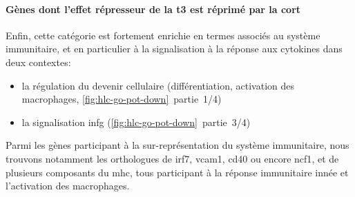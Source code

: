 \documentclass[../main.tex]{subfiles}
\begin{document}
				

			\paragraph{Gènes dont l'effet répresseur de la \gls{t3} est réprimé par la \gls{cort}}\label{par:hlc-go-pot-down}
				Enfin, cette catégorie est fortement enrichie en termes associés au système immunitaire, et en particulier à la signalisation à la réponse aux cytokines dans deux contextes:
				\begin{itemize}
					\item
						la régulation du devenir cellulaire (différentiation, activation des macrophages, \autoref{fig:hlc-go-pot-down}~partie~1/4)
					\item
						la signalisation \gls{infg} (\autoref{fig:hlc-go-pot-down}~partie~3/4)
				\end{itemize}

				

				Parmi les gènes participant à la sur-représentation du système immunitaire, nous trouvons notamment les orthologues de \gls{irf7}, \gls{vcam1}, \gls{cd40} ou encore \gls{ncf1}, et de plusieurs composants du \gls{mhc}, tous participant à la réponse immunitaire innée et l'activation des macrophages.
\end{document}
